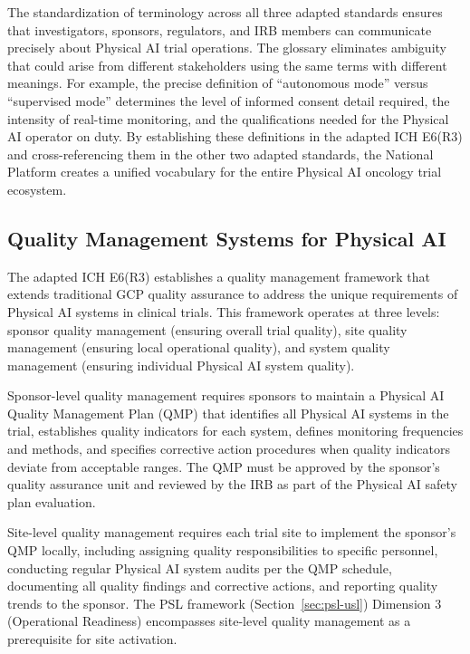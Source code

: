 The standardization of terminology across all three adapted standards ensures
that investigators, sponsors, regulators, and IRB members can communicate
precisely about Physical AI trial operations. The glossary eliminates ambiguity
that could arise from different stakeholders using the same terms with different
meanings. For example, the precise definition of ``autonomous mode'' versus
``supervised mode'' determines the level of informed consent detail required,
the intensity of real-time monitoring, and the qualifications needed for the
Physical AI operator on duty. By establishing these definitions in the adapted
ICH E6(R3) and cross-referencing them in the other two adapted standards, the
National Platform creates a unified vocabulary for the entire Physical AI
oncology trial ecosystem.

\subsection{Quality Management Systems for Physical AI}
\label{subsec:ich-quality-management}

The adapted ICH E6(R3) establishes a quality management framework that extends
traditional GCP quality assurance to address the unique requirements of Physical
AI systems in clinical trials. This framework operates at three levels: sponsor
quality management (ensuring overall trial quality), site quality management
(ensuring local operational quality), and system quality management (ensuring
individual Physical AI system quality).

Sponsor-level quality management requires sponsors to maintain a Physical AI
Quality Management Plan (QMP) that identifies all Physical AI systems in the
trial, establishes quality indicators for each system, defines monitoring
frequencies and methods, and specifies corrective action procedures when quality
indicators deviate from acceptable ranges. The QMP must be approved by the
sponsor's quality assurance unit and reviewed by the IRB as part of the
Physical AI safety plan evaluation.

Site-level quality management requires each trial site to implement the
sponsor's QMP locally, including assigning quality responsibilities to specific
personnel, conducting regular Physical AI system audits per the QMP schedule,
documenting all quality findings and corrective actions, and reporting quality
trends to the sponsor. The PSL framework (Section~\ref{sec:psl-usl}) Dimension
3 (Operational Readiness) encompasses site-level quality management as a
prerequisite for site activation.

